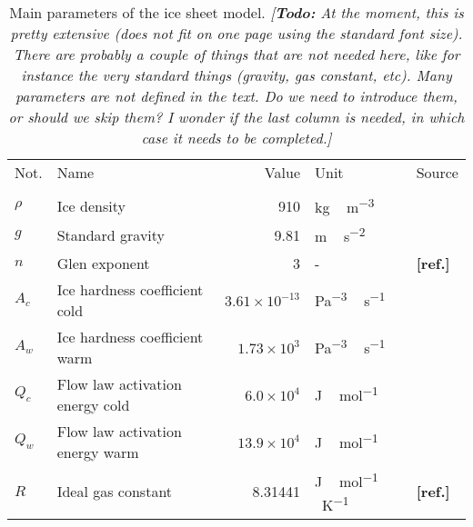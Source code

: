 \documentclass[tc, manuscript]{copernicus}
\newcommand{\todo}[1]{\emph{[\textbf{Todo:} #1]}}
\newcommand{\aref}[0]{\textbf{[ref.]}}
\begin{document}
\begin{table*}
  \centering
  \caption{Main parameters of the ice sheet model.
           \todo{At the moment, this is pretty extensive (does not fit on one
                 page using the standard font size). There are probably a
                 couple of things that are not needed here, like for instance
                 the very standard things (gravity, gas constant, etc). Many
                 parameters are not defined in the text. Do we need to
                 introduce them, or should we skip them? I wonder if the last
                 column is needed, in which case it needs to be completed.}}
  \label{tab:params}
  \footnotesize
  {\begin{tabular}{llrll}
    \tophline
    Not.    & Name & Value & Unit & Source \\
    \middlehline

    \multicolumn{2}{l}{\emph{Ice rheology}} \\

    $\rho$  & Ice density
            & 910
            & \unit{kg\,m^{-3}}
            & \citet{Aschwanden.etal.2012} \\

    $g$     & Standard gravity
            & 9.81
            & \unit{m\,s^{-2}}
            & \citet{Aschwanden.etal.2012} \\

    $n$     & Glen exponent
            & 3
            & -
            & \aref \\

    $A_c$   & Ice hardness coefficient cold
            & $3.61\times10^{-13}$
            & \unit{Pa^{-3}\,s^{-1}}
            & \citet{Paterson.Budd.1982} \\

    $A_w$   & Ice hardness coefficient warm
            & $1.73\times10^3$
            & \unit{Pa^{-3}\,s^{-1}}
            & \citet{Paterson.Budd.1982} \\

    $Q_c$   & Flow law activation energy cold
            & $6.0\times10^4$
            & \unit{J\,mol^{-1}}
            & \citet{Paterson.Budd.1982} \\

    $Q_w$   & Flow law activation energy warm
            & $13.9\times10^4$
            & \unit{J\,mol^{-1}}
            & \citet{Paterson.Budd.1982} \\

    $R$     & Ideal gas constant
            & 8.31441
            & \unit{J\,mol^{-1}\,K^{-1}}
            & \aref \\


\end{tabular}}
\end{table*}
\end{document}
